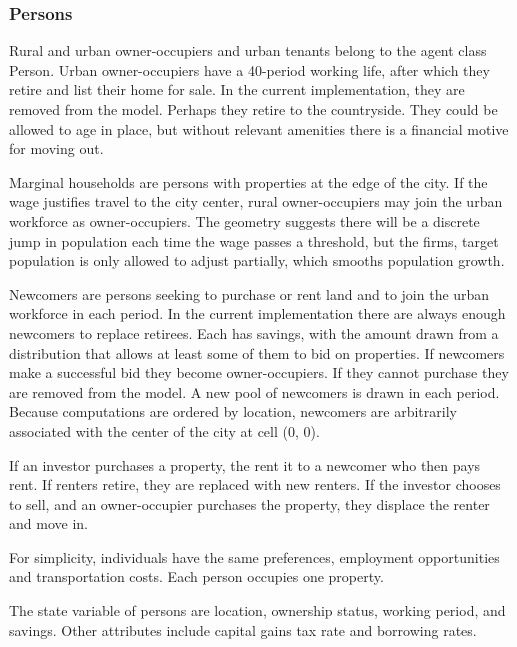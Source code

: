 \subsubsection{Persons}
Rural and urban owner-occupiers and urban tenants belong to the agent class Person. Urban owner-occupiers have a 40-period working life, after which they retire and list their home for sale.  In the current implementation,  they are removed from the model. Perhaps they retire to the countryside. They could be allowed to age in place, but without relevant amenities there is a financial motive for moving out. %

Marginal households are persons with properties at the edge of the city.  If the wage justifies travel to the city center, rural owner-occupiers may join the urban workforce as owner-occupiers. The geometry suggests there will be a discrete jump in population each time the wage passes a threshold, but the firms, target population is only allowed to adjust partially, which smooths population growth.

Newcomers are persons seeking to purchase or rent land and to join the urban workforce in each period. In the current implementation there are always enough newcomers to replace retirees. Each has savings, with the amount drawn from a distribution that allows at least some of them to bid on properties. If newcomers make a successful bid they become owner-occupiers. %
If they cannot purchase they are removed from the model. A new pool of newcomers is drawn in each period.  
Because computations are ordered by location, newcomers are arbitrarily associated with the center of the city at cell (0, 0).  

If an investor purchases a property, the rent it to a newcomer who then pays rent. If renters retire, they are replaced with new renters. If the investor chooses to sell, and an owner-occupier purchases the property, they displace the renter and move in.

For simplicity, individuals have the same preferences, employment opportunities and transportation costs.  Each person occupies one property.

The state variable of persons are location, ownership status, working period, and savings.  %
Other attributes include capital gains tax rate and borrowing rates. 

